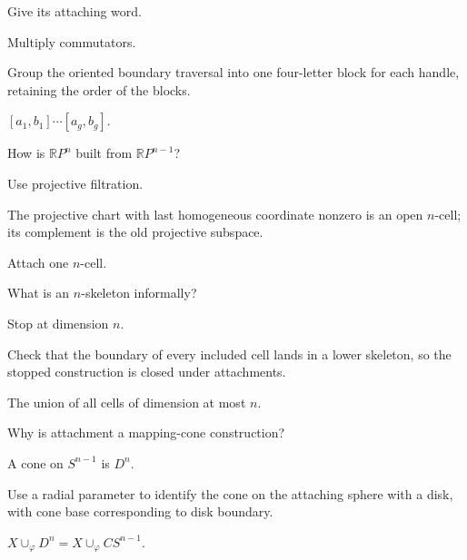 \begin{exercise}\label{exr:viii05-20}
Give its attaching word.
\end{exercise}
\begin{hint}
Multiply commutators.

Group the oriented boundary traversal into one four-letter block for each handle, retaining the order of the blocks.
\end{hint}
\begin{solution}
\([a_1,b_1]\cdots[a_g,b_g]\).
\end{solution}

\begin{exercise}\label{exr:viii05-21}
How is \(\mathbb RP^n\) built from \(\mathbb RP^{n-1}\)?
\end{exercise}
\begin{hint}
Use projective filtration.

The projective chart with last homogeneous coordinate nonzero is an open \(n\)-cell; its complement is the old projective subspace.
\end{hint}
\begin{solution}
Attach one \(n\)-cell.
\end{solution}

\begin{exercise}\label{exr:viii05-22}
What is an \(n\)-skeleton informally?
\end{exercise}
\begin{hint}
Stop at dimension \(n\).

Check that the boundary of every included cell lands in a lower skeleton, so the stopped construction is closed under attachments.
\end{hint}
\begin{solution}
The union of all cells of dimension at most \(n\).
\end{solution}

\begin{exercise}\label{exr:viii05-23}
Why is attachment a mapping-cone construction?
\end{exercise}
\begin{hint}
A cone on \(S^{n-1}\) is \(D^n\).

Use a radial parameter to identify the cone on the attaching sphere with a disk, with cone base corresponding to disk boundary.
\end{hint}
\begin{solution}
\(X\cup_\varphi D^n=X\cup_\varphi CS^{n-1}\).
\end{solution}

